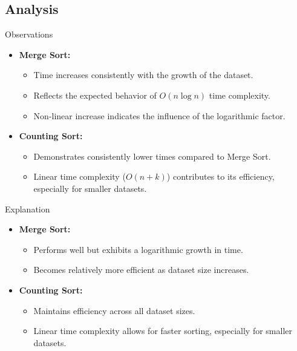 \documentclass{beamer}
\begin{document}
		
\subsection{Analysis}

\begin{frame}{Observations}
	\begin{itemize}
		\item \textbf{Merge Sort:}
		\begin{itemize}
			\item Time increases consistently with the growth of the dataset.
			\item Reflects the expected behavior of \(O(n \log n)\) time complexity.
			\item Non-linear increase indicates the influence of the logarithmic factor.
		\end{itemize}
		\item \textbf{Counting Sort:}
		\begin{itemize}
			\item Demonstrates consistently lower times compared to Merge Sort.
			\item Linear time complexity (\(O(n + k)\)) contributes to its efficiency, especially for smaller datasets.
		\end{itemize}
	\end{itemize}
\end{frame}

\begin{frame}{Explanation}
	\begin{itemize}
		\item \textbf{Merge Sort:}
		\begin{itemize}
			\item Performs well but exhibits a logarithmic growth in time.
			\item Becomes relatively more efficient as dataset size increases.
		\end{itemize}
		\item \textbf{Counting Sort:}
		\begin{itemize}
			\item Maintains efficiency across all dataset sizes.
			\item Linear time complexity allows for faster sorting, especially for smaller datasets.
		\end{itemize}
	\end{itemize}
\end{frame}
\end{document}
